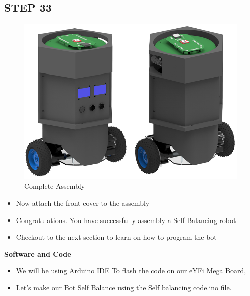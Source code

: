 \documentclass[12pt,a4paper,oneside]{book}
\begin{document}
			\subsection*{STEP 33}
				\begin{figure}[H]
					\begin{center}
						\includegraphics[scale=0.7]{COMPLETE ASSEMBLY}
						\caption{Complete Assembly}
					\end{center}
				\end{figure}
				\begin{itemize}
					\item Now attach the front cover to the assembly
					\item Congratulations. You have successfully assembly a Self-Balancing robot
					\item Checkout to the next section to learn on how to program the bot 
				\end{itemize}
				\pagebreak

        \begin{huge}
			\textbf{Software and Code}
		\end{huge}
  \newline
  \begin{itemize}
    \item We will be using Arduino IDE To flash the code on our eYFi Mega Board,
    \item Let's make our Bot Self Balance using the \href{https://github.com/eYSIP-2022/71-Self_Balancing_Robot_Development/blob/main/Self_balancing_code/Self_balancing_code.ino}{Self balancing code.ino} file.
  \end{itemize}
\end{document}
